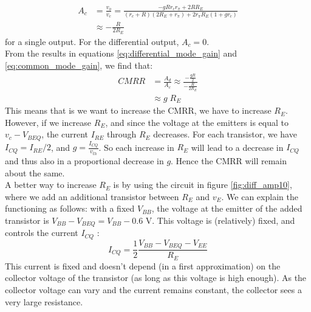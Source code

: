 \begin{equation}
	\begin{split}
		A_c &= \frac{v_o}{v_c} = \frac{-g R r_c r_{\pi} + 2R R_E}{(r_c + R)(2R_E + r_{\pi}) + 2r_{\pi} R_E(1 + g r_c)} \\
		&\approx - \frac{R}{2R_E}
	\end{split}
	\label{eq:common_mode_gain}
\end{equation}
for a single output. For the differential output, $A_c = 0$.\\
From the results in equations \ref{eq:differential_mode_gain} and \ref{eq:common_mode_gain}, we find that:
\begin{equation}
	\begin{split}
	CMRR &= \frac{A_d}{A_c} \approx \frac{-\frac{g R}{2}}{- \frac{R}{2R_E}}\\
		 &\approx g \; R_E
	\end{split}
	\label{eq:cmrr}
\end{equation}
This means that is we want to increase the CMRR, we have to increase $R_E$. However, if we increase $R_E$, and since the voltage at the emitters is equal to $v_c - V_{BEQ}$, the current $I_{RE}$ through $R_E$ decreases. For each transistor, we have $I_{CQ} = I_{RE}/2$, and $g = \frac{I_{CQ}}{v_{th}}$. So each increase in $R_E$ will lead to a decrease in $I_{CQ}$ and thus also in a proportional decrease in $g$. Hence the CMRR will remain about the same.\\
A better way to increase $R_E$ is by using the circuit in figure \ref{fig:diff_amp10}, where we add an additional transistor between $R_E$ and $v_E$. We can explain the functioning as follows: with a fixed $V_{BB}$, the voltage at the emitter of the added transistor is $V_{BB} - V_{BEQ} = V_{BB} - 0.6$ V. This voltage is (relatively) fixed, and controls the current $I_{CQ}$ :
$$
I_{CQ} = \frac{1}{2}\frac{V_{BB} - V_{BEQ} - V_{EE}}{R_E}
$$
This current is fixed and doesn't depend (in a first approximation) on the collector voltage of the transistor (as long as this voltage is high enough). As the collector voltage can vary and the current remains constant, the collector sees a very large resistance.\\

